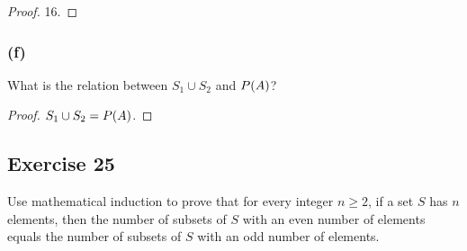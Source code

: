 \documentclass[14pt]{extarticle}
\let\mathscr\relax
\newcommand{\ps}{\mathscr{P}}
\begin{document}
\begin{proof}
  16.
\end{proof}

\subsubsection{(f)}
What is the relation between \(S_1 \cup S_2\) and \(\ps(A)\)?

\begin{proof}
  \(S_1 \cup S_2 = \ps(A)\).
\end{proof}

\subsection{Exercise 25}
Use mathematical induction to prove that for every integer $n \geq 2$, if a set $S$ has $n$ elements, then the number
of subsets of $S$ with an even number of elements equals the number of subsets of $S$ with an odd number of elements.
\end{document}
